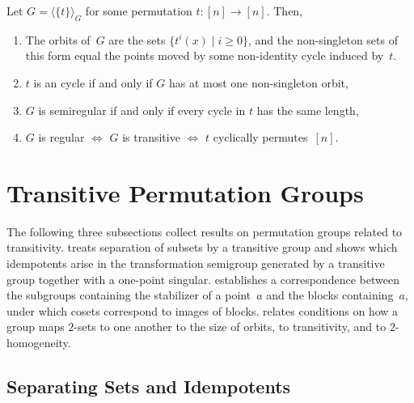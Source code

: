 \begin{example} \label{prelim:permgrp:ex:singleperm}
	Let $G = \langle \{ t\} \rangle_G$ for some permutation 
	$t \colon [n] \to [n]$.	Then,
	
	\begin{enumerate}
		\item The orbits of~$G$ are the sets $\{ t^i(x) \mid i \ge 0\}$,
		and the non-singleton sets of this form
		equal the points moved by some non-identity
		cycle induced by~$t$.
			
		\item $t$ is an cycle if and only if $G$
		has at most one non-singleton orbit,
		
		\item \label{prelim:permgrp:ex:singleperm:2} $G$ is semiregular if and only if every cycle in $t$ 
		has the same length,
		
		
		\item $G$ is regular $\Leftrightarrow$ $G$ is transitive $\Leftrightarrow$ $t$ cyclically permutes~$[n]$.
		
	\end{enumerate} 
\end{example} 

\section{Transitive Permutation Groups}
\label{prelim:permgrp:sec:transitive}

The following three subsections collect results on permutation groups related to transitivity.
 treats separation of subsets by a transitive
group and shows which idempotents arise in the transformation semigroup generated by a
transitive group together with a one-point singular.
 establishes a correspondence between the subgroups
containing the stabilizer of a point~$a$ and the blocks containing~$a$, under which cosets
correspond to images of blocks.
 relates conditions on how a group maps $2$-sets to one
another to the size of orbits, to transitivity, and to $2$-homogeneity.

\subsection{Separating Sets and Idempotents}
\label{prelim:perm:subsec:sep-sets-idempotents}

